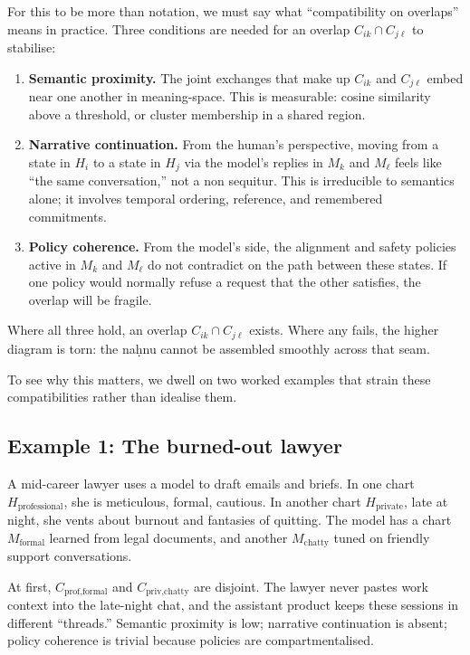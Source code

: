 \documentclass[12pt,a4paper]{article}
\begin{document}
For this to be more than notation, we must say what ``compatibility on overlaps'' means in practice. Three conditions are needed for an overlap $C_{ik} \cap C_{j\ell}$ to stabilise:

\begin{enumerate}
  \item \textbf{Semantic proximity.} The joint exchanges that make up $C_{ik}$ and $C_{j\ell}$ embed near one another in meaning-space. This is measurable: cosine similarity above a threshold, or cluster membership in a shared region.
  \item \textbf{Narrative continuation.} From the human's perspective, moving from a state in $H_i$ to a state in $H_j$ via the model's replies in $M_k$ and $M_\ell$ feels like ``the same conversation,'' not a non sequitur. This is irreducible to semantics alone; it involves temporal ordering, reference, and remembered commitments.
  \item \textbf{Policy coherence.} From the model's side, the alignment and safety policies active in $M_k$ and $M_\ell$ do not contradict on the path between these states. If one policy would normally refuse a request that the other satisfies, the overlap will be fragile.
\end{enumerate}

Where all three hold, an overlap $C_{ik} \cap C_{j\ell}$ exists. Where any fails, the higher diagram is torn: the na\d{h}nu cannot be assembled smoothly across that seam.

To see why this matters, we dwell on two worked examples that strain these compatibilities rather than idealise them.

\subsection*{Example 1: The burned-out lawyer}

A mid-career lawyer uses a model to draft emails and briefs. In one chart $H_{\text{professional}}$, she is meticulous, formal, cautious. In another chart $H_{\text{private}}$, late at night, she vents about burnout and fantasies of quitting. The model has a chart $M_{\text{formal}}$ learned from legal documents, and another $M_{\text{chatty}}$ tuned on friendly support conversations.

At first, $C_{\text{prof,formal}}$ and $C_{\text{priv,chatty}}$ are disjoint. The lawyer never pastes work context into the late-night chat, and the assistant product keeps these sessions in different ``threads.'' Semantic proximity is low; narrative continuation is absent; policy coherence is trivial because policies are compartmentalised.
\end{document}
